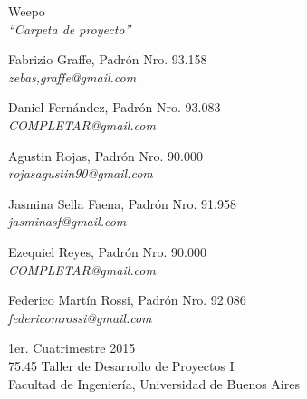 \documentclass[oneside]{book}
\begin{document}

\thispagestyle{empty}



\begin{titlepage}
	\vspace*{\fill}
	\begin{center}
		\Huge{Weepo} \\
		\medskip
		\huge \textit{``Carpeta de proyecto''} \\
		
		\bigskip\bigskip\bigskip\bigskip\bigskip\bigskip

		\Large Fabrizio Graffe, Padrón Nro. 93.158 \\
		\large \textit{zebas,graffe@gmail.com} \\ \medskip
		
		\Large Daniel Fernández, Padrón Nro. 93.083 \\
		\large \textit{COMPLETAR@gmail.com} \\ \medskip
		
		\Large Agustin Rojas, Padrón Nro. 90.000 \\
		\large \textit{rojasagustin90@gmail.com} \\ \medskip

		\Large Jasmina Sella Faena, Padrón Nro. 91.958 \\
		\large \textit{jasminasf@gmail.com} \\ \medskip

		\Large Ezequiel Reyes, Padrón Nro. 90.000 \\
		\large \textit{COMPLETAR@gmail.com} \\ \medskip
		
		\Large Federico Martín Rossi, Padrón Nro. 92.086 \\
		\large \textit{federicomrossi@gmail.com} \\

		\bigskip\bigskip\bigskip\bigskip\bigskip\bigskip

		\large 1er. Cuatrimestre 2015 \\ \smallskip
		\large 75.45 Taller de Desarrollo de Proyectos I \\ \smallskip
		\large Facultad de Ingeniería, Universidad de Buenos Aires \\ \smallskip

		\date{}
	\end{center}
	\vspace*{\fill}
\end{titlepage}
\end{document}
